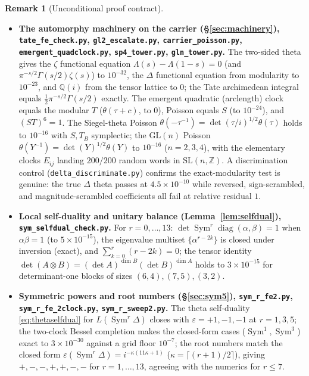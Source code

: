 \documentclass[11pt]{article}
\theoremstyle{definition}
\newtheorem{remark}[theorem]{Remark}
\newcommand{\Sym}{\operatorname{Sym}}
\begin{document}
\begin{remark}[Unconditional proof contract]
\begin{enumerate}
\begin{itemize}
\item \textbf{The automorphy machinery on the carrier (\S\ref{sec:machinery}),
\texttt{tate\_fe\_check.py}, \texttt{gl2\_escalate.py}, \texttt{carrier\_poisson.py},
\texttt{emergent\_quadclock.py}, \texttt{sp4\_tower.py}, \texttt{gln\_tower.py}.} The two-sided theta
gives the $\zeta$ functional equation $\Lambda(s)-\Lambda(1-s)=0$ (and $\pi^{-s/2}\Gamma(s/2)\zeta(s)$)
to $10^{-32}$, the $\Delta$ functional equation from modularity to $10^{-23}$, and $\mathbb Q(i)$ from
the tensor lattice to $0$; the Tate archimedean integral equals $\tfrac12\pi^{-s/2}\Gamma(s/2)$
exactly. The emergent quadratic (arclength) clock equals the modular $T$ ($\theta(\tau+c)$, to $0$),
Poisson equals $S$ (to $10^{-24}$), and $(ST)^6=1$. The Siegel-theta Poisson $\theta(-\tau^{-1})=
\det(\tau/i)^{1/2}\theta(\tau)$ holds to $10^{-16}$ with $S,T_B$ symplectic; the $\mathrm{GL}(n)$
Poisson $\theta(Y^{-1})=\det(Y)^{1/2}\theta(Y)$ to $10^{-16}$ ($n=2,3,4$), with the elementary clocks
$E_{ij}$ landing $200/200$ random words in $\mathrm{SL}(n,\mathbb Z)$. A discrimination control
(\texttt{delta\_discriminate.py}) confirms the exact-modularity test is genuine: the true $\Delta$
theta passes at $4.5\times10^{-10}$ while reversed, sign-scrambled, and magnitude-scrambled
coefficients all fail at relative residual $1$.

\item \textbf{Local self-duality and unitary balance (Lemma~\ref{lem:selfdual}), \texttt{sym\_selfdual\_check.py}.}
For $r=0,\dots,13$: $\det\Sym^r\operatorname{diag}(\alpha,\beta)=1$ when $\alpha\beta=1$ (to $5\times10^{-15}$),
the eigenvalue multiset $\{\alpha^{r-2k}\}$ is closed under inversion (exact), and $\sum_{k=0}^r(r-2k)=0$;
the tensor identity $\det(A\otimes B)=(\det A)^{\dim B}(\det B)^{\dim A}$ holds to $3\times10^{-15}$ for
determinant-one blocks of sizes $(6,4),(7,5),(3,2)$.

\item \textbf{Symmetric powers and root numbers (\S\ref{sec:sym5}), \texttt{sym\_r\_fe2.py},
\texttt{sym\_r\_fe\_2clock.py}, \texttt{sym\_r\_sweep2.py}.} The theta self-duality
\eqref{eq:thetaselfdual} for $L(\Sym^r\Delta)$ closes with $\varepsilon=+1,-1,-1$ at $r=1,3,5$; the
two-clock Bessel completion makes the closed-form cases ($\Sym^1,\Sym^3$) exact to $3\times10^{-30}$
against a grid floor $10^{-7}$; the root numbers match the closed form
$\varepsilon(\Sym^r\Delta)=i^{-\kappa(11\kappa+1)}$ ($\kappa=\lceil(r{+}1)/2\rceil$), giving
$+,-,-,+,+,-,-$ for $r=1,\dots,13$, agreeing with the numerics for $r\le7$.


\end{itemize}
\end{enumerate}
\end{remark}
\end{document}
